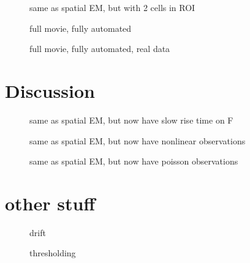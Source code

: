 \begin{figure}
\caption{same as spatial EM, but with 2 cells in ROI} \label{fig:spatial_multi}
\end{figure}

\begin{figure}
\caption{full movie, fully automated} \label{fig:spatial_full}
\end{figure}

\begin{figure}
\caption{full movie, fully automated, real data} \label{fig:spatial_full_data}
\end{figure}

\section{Discussion}

\begin{figure}
\caption{same as spatial EM, but now have slow rise time on F} \label{fig:slow_rise}
\end{figure}

\begin{figure}
\caption{same as spatial EM, but now have nonlinear observations} \label{fig:nonlin}
\end{figure}

\begin{figure}
\caption{same as spatial EM, but now have poisson observations} \label{fig:poisson}
\end{figure}

\section{other stuff}

\begin{figure}
\caption{drift}
\end{figure}

\begin{figure}
\caption{thresholding}
\end{figure}

